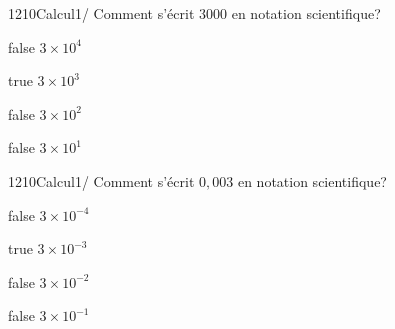         	\begin{question}{1210}{Calcul}{1}{/}
				Comment s'écrit $3000$ en notation scientifique? 
            \end{question}
            \begin{reponses}
            	\item[false] $3\times 10^4$
            	\item[true] $3\times 10^3$
                \item[false] $3\times 10^2$
                \item[false] $3\times 10^1$
            \end{reponses}
        	\begin{question}{1210}{Calcul}{1}{/}
				Comment s'écrit $0,003$ en notation scientifique? 
            \end{question}
            \begin{reponses}
            	\item[false] $3\times 10^{-4}$
            	\item[true] $3\times 10^{-3}$
                \item[false] $3\times 10^{-2}$
                \item[false] $3\times 10^{-1}$
            \end{reponses}
